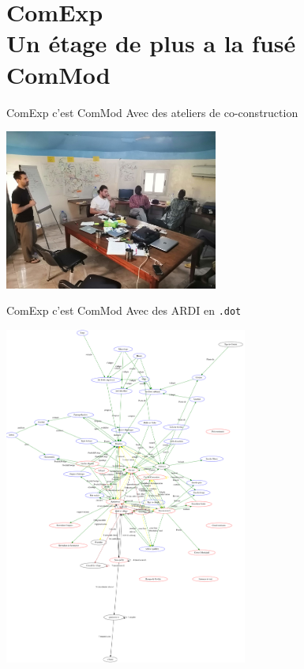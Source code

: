 \documentclass[newPxFont]{beamer}
\begin{document}

\section{ComExp\\ Un étage de plus a la fusé ComMod}


\begin{frame}[c]{ComExp c'est ComMod}
  \vspace{-1cm}
  Avec des ateliers de co-construction
  \begin{center}
  \includegraphics[width=7cm]{img/atelier_niakhar.jpg}
  \end{center}
\end{frame}

\begin{frame}[c]{ComExp c'est ComMod}
  \vspace{-1cm}
  Avec des ARDI en \texttt{.dot}
  \begin{center}
  \includegraphics[width=8cm]{img/pardi_fdp.png}
  \end{center}
\end{frame}
\end{document}
